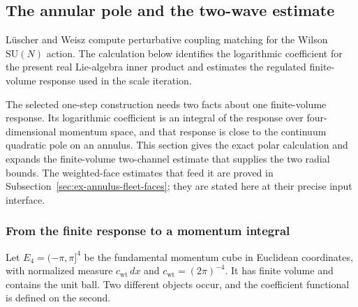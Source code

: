 \subsection{The annular pole and the two-wave estimate}
\label{sec:ex-annulus-two-wave}

L\"uscher and Weisz \cite[\S1]{LuscherWeiszCoupling} compute perturbative
coupling matching for the Wilson $\mathrm{SU}(N)$ action. The calculation
below identifies the logarithmic coefficient for the present real
Lie-algebra inner product and estimates the regulated finite-volume
response used in the scale iteration.


The selected one-step construction needs two facts about one finite-volume
response. Its logarithmic coefficient is an integral of the response over
four-dimensional momentum space, and that response is close to the continuum
quadratic pole on an annulus. This section gives the exact polar calculation
and expands the finite-volume two-channel estimate that supplies the two
radial bounds. The weighted-face estimates that feed it are proved in
Subsection~\ref{sec:ex-annulus-fleet-faces}; they are stated here at their
precise input interface.

\subsubsection{From the finite response to a momentum integral}

Let $E_4=(-\pi,\pi]^4$ be the fundamental momentum cube in Euclidean
coordinates, with normalized measure $c_{\mathrm{wt}}\,dx$ and
$c_{\mathrm{wt}}=(2\pi)^{-4}$. It has finite volume and contains the unit
ball. Two different objects occur, and the coefficient functional is
defined on the second.

